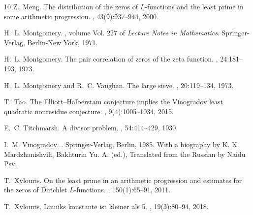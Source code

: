 \documentclass[pdflatex]{sn-jnl}%
\theoremstyle{sltheorems}
\theoremstyle{plainrem}
\theoremstyle{definition}
\begin{document}
\begin{thebibliography}{10}
Z.~Meng.
\newblock The distribution of the zeros of {$L$}-functions and the least prime
  in some arithmetic progression.
, 43(9):937--944, 2000.

H.~L. Montgomery.
, volume Vol. 227 of
  {\em Lecture Notes in Mathematics}.
\newblock Springer-Verlag, Berlin-New York, 1971.

H.~L. Montgomery.
\newblock The pair correlation of zeros of the zeta function.
, 24:181--193, 1973.

H.~L. Montgomery and R.~C. Vaughan.
\newblock The large sieve.
, 20:119--134, 1973.

T.~Tao.
\newblock The {E}lliott--{H}alberstam conjecture implies the {V}inogradov least
  quadratic nonresidue conjecture.
, 9(4):1005--1034, 2015.

E.~C. Titchmarsh.
\newblock A divisor problem.
, 54:414--429, 1930.

I.~M. Vinogradov.
.
\newblock Springer-Verlag, Berlin, 1985.
\newblock With a biography by K. K. Mardzhanishvili, Bakhturin Yu. A. (ed.),
  Translated from the Russian by Naidu Psv.

T.~Xylouris.
\newblock On the least prime in an arithmetic progression and estimates for the
  zeros of {D}irichlet {$L$}-functions.
, 150(1):65--91, 2011.

T.~Xylouris.
\newblock Linniks konstante ist kleiner als 5.
, 19(3):80--94, 2018.

\end{thebibliography}
\end{document}
